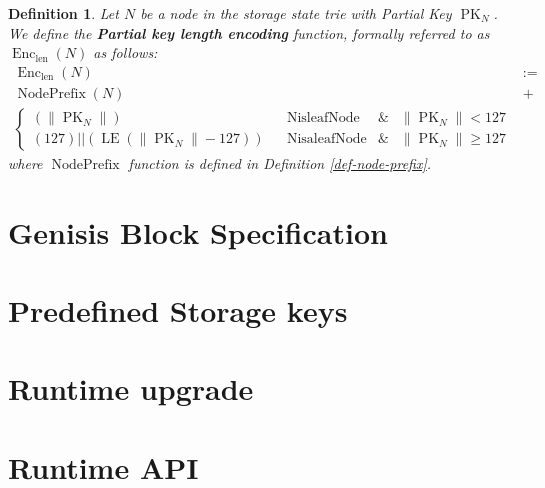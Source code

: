 \documentclass{article}
\newcommand{\assign}{:=}
\newcommand{\tmop}[1]{\ensuremath{\operatorname{#1}}}
\newcommand{\tmstrong}[1]{\textbf{#1}}
\newcommand{\tmtextbf}[1]{{\bfseries{#1}}}
\newtheorem{definition}{Definition}
\providecommand{\tmop}[1]{\ensuremath{\mathrm{#1}}}
\providecommand{\tmstrong}[1]{\tmtextbf{#1}}
\providecommand{\tmtextbf}[1]{\tmtextbf{#1}}
\newtheorem{definition}{Definition}
\begin{document}
\begin{definition}
  \label{def-key-len-enc}Let $N$ be a node in the storage state trie with
  Partial Key $\tmop{PK}_N$. We define the {\tmstrong{Partial key length
  encoding}} function, formally referred to as $\tmop{Enc}_{\tmop{len}} (N)$
  as follows:
  \[ \begin{array}{ll}
       \tmop{Enc}_{\tmop{len}} (N) & \assign\\
       \tmop{NodePrefix} (N) & +\\
       \left\{ \begin{array}{lllll}
         (\| \tmop{PK}_N \|) &  & \tmop{NisleafNode} & \& & \| \tmop{PK}_N \|<
         127\\
         (127) || (\tmop{LE} (\| \tmop{PK}_N \|- 127)) &  &
         \tmop{NisaleafNode} & \& & \| \tmop{PK}_N \| \geqslant 127
       \end{array} \right. & 
     \end{array} \]
  where $\tmop{NodePrefix}$ function is defined in Definition
  \ref{def-node-prefix}.
\end{definition}

\section{Genisis Block Specification}\label{sect-genisis-block}

\section{Predefined Storage keys}\label{sect-predef-storage-keys}

\section{Runtime upgrade}\label{sect-runtime-upgrade}

\section{Runtime API}\label{sect-runtime-api}
\end{document}
